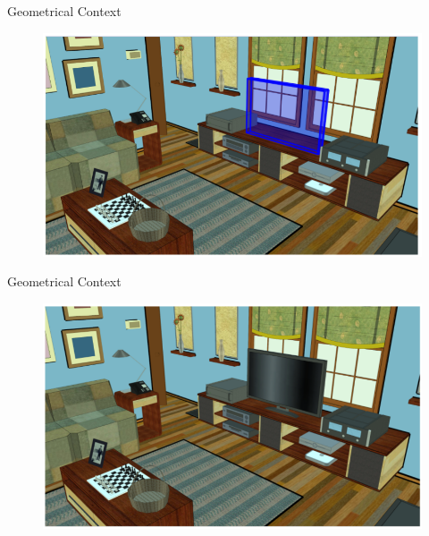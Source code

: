 \documentclass{beamer}
\begin{document}
\begin{frame}{Geometrical Context}
\begin{figure}[t!]
\includegraphics[width=.8\linewidth]{contextHole.png}
\end{figure}
\end{frame}


\begin{frame}{Geometrical Context}
\begin{figure}[t!]
\includegraphics[width=.8\linewidth]{contextHoleFilled.png}
\end{figure}
\end{frame}
\end{document}
